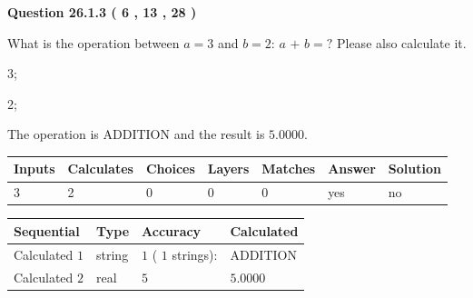 \documentclass[12pt]{article}
\begin{document}
   
  
\vspace{0.2in}
  
{\textbf{\Large{Question
26.1.3 
 (           6 ,          13 ,          28 )
}}}
  
  
What is the operation between $a= %
3$ and $b= %
2$:
$a$  %
$+$ $b=?$ Please also calculate it.
 
 
\noindent{}
 
 

3;
 
2;
 
The operation is  %
ADDITION and the result is
$ %
5.0000$.
 
 
 
\noindent{}
 
 

 
\vspace{0.3in}
   
   
   
   
\noindent\begin{tabular}{|l|l|l|l|l|l|l|}
 \hline
Inputs & Calculates & Choices & Layers & Matches & Answer & Solution \\ \hline
           3  & 
           2  & 
           0
  & 
           0  & 
           0  & 
  yes & 
  no 
  \\ \hline
 \end{tabular}
   
   
   
   
\noindent{}
   
   
  
  
\noindent\begin{tabular}{|l|l|l|l|}
\hline
 Sequential & Type & Accuracy & Calculated \\ 
\hline
 
 
  Calculated $            1 $ & string & $            1  $ ( $           1  $ strings): 
 & ADDITION
 \\  \hline  
 
 
  Calculated $            2 $ & real & $            5  $ & 
 $ 5.0000 $ 
 \\  \hline  
 \end{tabular}
   
   
   
\end{document}
